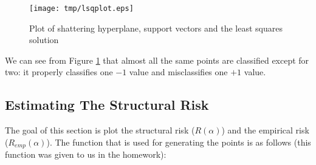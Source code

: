 \documentclass[11pt, twoside]{article}   	%
\begin{document}
\begin{figure}[h]
\centering
\texttt{[image: tmp/lsqplot.eps]}
\caption{Plot of shattering hyperplane, support vectors and the least
squares solution}
\label{fig:lsq} 
\end{figure}

We can see from Figure \ref{fig:lsq} that almost all the same points are 
classified except for two: it properly classifies one $-1$ value and 
misclassifies one $+1$ value. 

\subsection{Estimating The Structural Risk}

The goal of this section is plot the structural risk ($R(\alpha)$) and 
the empirical risk ($R_{emp}(\alpha)$). The function that is used for
generating the points is as follows (this function was given to us 
in the homework): 


\end{document}
